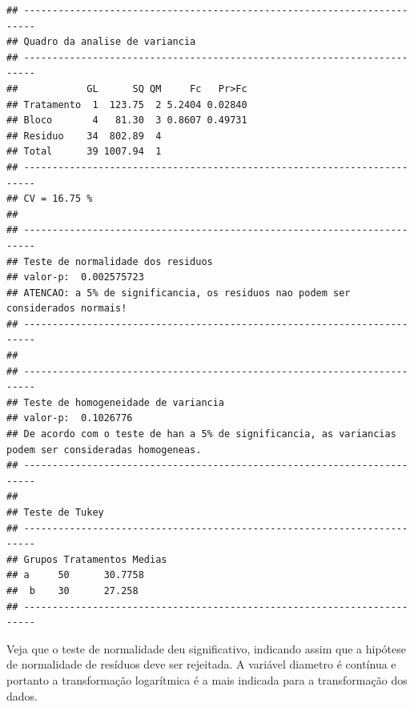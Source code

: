\documentclass[
]{article}
\newenvironment{Shaded}{\begin{snugshade}}{\end{snugshade}}
\newcommand{\DataTypeTok}[1]{\textcolor[rgb]{0.13,0.29,0.53}{#1}}
\newcommand{\KeywordTok}[1]{\textcolor[rgb]{0.13,0.29,0.53}{\textbf{#1}}}
\newcommand{\NormalTok}[1]{#1}
\newcommand{\OperatorTok}[1]{\textcolor[rgb]{0.81,0.36,0.00}{\textbf{#1}}}
\newcommand{\StringTok}[1]{\textcolor[rgb]{0.31,0.60,0.02}{#1}}
\begin{document}
\begin{verbatim}
## ------------------------------------------------------------------------
## Quadro da analise de variancia
## ------------------------------------------------------------------------
##            GL      SQ QM     Fc   Pr>Fc
## Tratamento  1  123.75  2 5.2404 0.02840
## Bloco       4   81.30  3 0.8607 0.49731
## Residuo    34  802.89  4               
## Total      39 1007.94  1               
## ------------------------------------------------------------------------
## CV = 16.75 %
## 
## ------------------------------------------------------------------------
## Teste de normalidade dos residuos 
## valor-p:  0.002575723 
## ATENCAO: a 5% de significancia, os residuos nao podem ser considerados normais!
## ------------------------------------------------------------------------
## 
## ------------------------------------------------------------------------
## Teste de homogeneidade de variancia 
## valor-p:  0.1026776 
## De acordo com o teste de han a 5% de significancia, as variancias podem ser consideradas homogeneas.
## ------------------------------------------------------------------------
## 
## Teste de Tukey
## ------------------------------------------------------------------------
## Grupos Tratamentos Medias
## a     50      30.7758 
##  b    30      27.258 
## ------------------------------------------------------------------------
\end{verbatim}

Veja que o teste de normalidade deu significativo, indicando assim que a hipótese de normalidade de resíduos deve ser rejeitada. A variável diametro é contínua e portanto a transformação logarítmica é a mais indicada para a transformação dos dados.

\begin{Shaded}
\end{Shaded}
\end{document}
